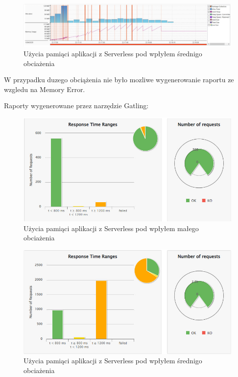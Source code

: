\documentclass[runningheads,12pt]{llncs}
\begin{document}
\begin{figure}
    \includegraphics[width=\linewidth]{images/serverless-memory-middle-graph.jpg}
    \caption{Użycia pamiąci aplikacji z Serverless pod wpłyłem średnigo obciażenia} \label{fig1}
\end{figure}

W przypadku duzego obciążenia nie było mozliwe wygenerowanie raportu ze wzgledu na Memory Error.


Raporty wygenerowane przez narzędzie Gatling:

\begin{figure}
    \includegraphics[width=\linewidth]{images/serverless-gatling-low-graph.jpg}
    \caption{Użycia pamiąci aplikacji z Serverless pod wpłyłem małego obciażenia} \label{fig1}
\end{figure}

\begin{figure}
    \includegraphics[width=\linewidth]{images/serverless-gatling-middle-graph.jpg}
    \caption{Użycia pamiąci aplikacji z Serverless pod wpłyłem średnigo obciażenia} \label{fig1}
\end{figure}
\end{document}
